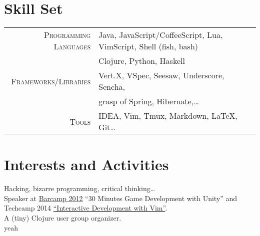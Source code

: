 \documentclass[a4paper,10pt]{article}
\begin{document}
\section{Skill Set}
\begin{tabular}{rl}
    \textsc{Programming Languages} & Java, JavaScript/CoffeeScript, Lua, VimScript, Shell (fish, bash)\\
                                   & Clojure, Python, Haskell\\
    \textsc{Frameworks/Libraries} & Vert.X, VSpec, Seesaw, Underscore, Sencha,\\
                                  & grasp of Spring, Hibernate,\ldots\\
    \textsc{Tools} & IDEA, Vim, Tmux, Markdown, \LaTeX, Git\ldots\\
\end{tabular}

\section{Interests and Activities}
Hacking, bizarre programming, critical thinking\ldots\\
Speaker at \href{http://www.barcampsaigon.org/2012/09/thank-you-barcampers-sponsors-volunteers/}{Barcamp 2012} ``30 Minutes Game Development with Unity'' and Techcamp 2014 \href{http://www.slideshare.net/huylenq/interactive-development-with-vim-techcamp}{``Interactive Development with Vim''}.\\
A (tiny) Clojure user group organizer.\\

\newpage
\hypertarget{test}{yeah}


\end{document}
